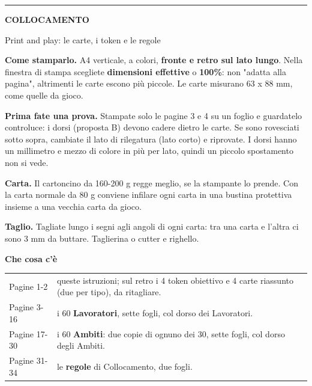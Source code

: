 \documentclass[10pt]{article}
\begin{document}
\color{petrolio}

\vspace*{16mm}\hspace*{18mm}\begin{minipage}[t]{174mm}\fontsize{10.5}{14.2}\selectfont\setlength{\parskip}{2.4mm}
{\color{rosa}\rule{14mm}{2.8pt}}\par\vspace{1mm}
{\fontsize{24}{27}\selectfont\bfseries COLLOCAMENTO\par}
{\fontsize{12}{15}\selectfont Print and play: le carte, i token e le regole\par}
\vspace{5mm}
\textbf{Come stamparlo.} A4 verticale, a colori, \textbf{fronte e retro sul lato lungo}. Nella finestra di stampa scegliete \textbf{dimensioni effettive} o \textbf{100\%}: non "adatta alla pagina", altrimenti le carte escono più piccole. Le carte misurano 63 x 88 mm, come quelle da gioco.

\textbf{Prima fate una prova.} Stampate solo le pagine 3 e 4 su un foglio e guardatelo controluce: i dorsi (proposta B) devono cadere dietro le carte. Se sono rovesciati sotto sopra, cambiate il lato di rilegatura (lato corto) e riprovate. I dorsi hanno un millimetro e mezzo di colore in più per lato, quindi un piccolo spostamento non si vede.

\textbf{Carta.} Il cartoncino da 160-200 g regge meglio, se la stampante lo prende. Con la carta normale da 80 g conviene infilare ogni carta in una bustina protettiva insieme a una vecchia carta da gioco.

\textbf{Taglio.} Tagliate lungo i segni agli angoli di ogni carta: tra una carta e l'altra ci sono 3 mm da buttare. Taglierina o cutter e righello.

\vspace{2mm}
{\fontsize{13}{16}\selectfont\bfseries Che cosa c'è\par}
\vspace{1mm}
\begin{tabular}{@{}p{30mm}p{140mm}@{}}
Pagine 1-2 & queste istruzioni; sul retro i 4 token obiettivo e 4 carte riassunto (due per tipo), da ritagliare. \\[1mm]
Pagine 3-16 & i 60 \textbf{Lavoratori}, sette fogli, col dorso dei Lavoratori. \\[1mm]
Pagine 17-30 & i 60 \textbf{Ambiti}: due copie di ognuno dei 30, sette fogli, col dorso degli Ambiti. \\[1mm]
Pagine 31-34 & le \textbf{regole} di Collocamento, due fogli. \\
\end{tabular}


\end{minipage}
\end{document}
